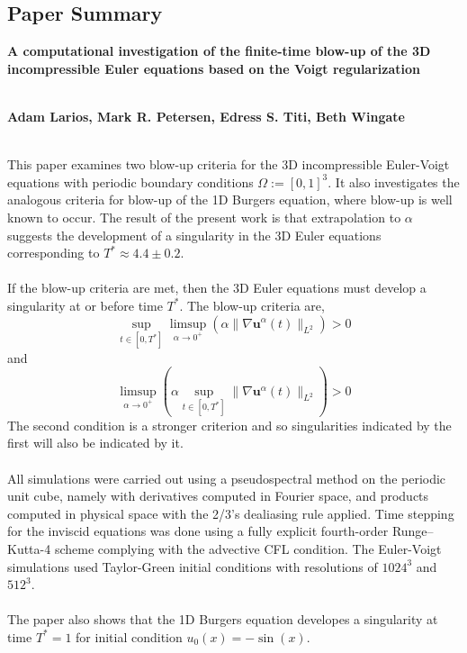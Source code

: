 \documentclass[12pt]{article}
\begin{document}
\begin{flushleft}
\pagebreak

\section{Paper Summary}
\begin{center}
\begin{large}
\textbf{A computational investigation of the finite-time blow-up of the 3D incompressible Euler equations based on the Voigt regularization}
\\~\\
\end{large}
\textbf{Adam Larios, Mark R. Petersen, Edress S. Titi, Beth Wingate}
\\~\\
\end{center}

\qquad This paper examines two blow-up criteria for the 3D incompressible Euler-Voigt equations with periodic boundary conditions $\Omega := [0,1]^3$. It also investigates the analogous criteria for blow-up of the 1D Burgers equation, where blow-up is well known to occur. The result of the present work is that extrapolation to $\alpha$ suggests the development of a singularity in the 3D Euler equations corresponding to $T^* \approx 4.4 \pm 0.2$.
\\~\\
If the blow-up criteria are met, then the 3D Euler equations must develop a singularity at or before time $T^*$. The blow-up criteria are,
$$\sup_{t\in[0,T^*]}\limsup_{\alpha\rightarrow 0^+}(\alpha\|\nabla\textbf{u}^\alpha(t)\|_{L^2}) > 0$$
and
$$\limsup_{\alpha\rightarrow 0^+} \left( \alpha \sup_{t\in [0,T^*]}\|\nabla\textbf{u}^\alpha(t)\|_{L^2} \right) > 0$$
The second condition is a stronger criterion and so singularities indicated by the first will also be indicated by it.
\\~\\
\qquad All simulations were carried out using a pseudospectral method on the periodic unit cube, namely with derivatives computed in Fourier space, and products computed in physical space with the 2/3’s dealiasing rule applied. Time stepping for the inviscid equations was done using a fully explicit fourth-order Runge–Kutta-4 scheme complying with the advective CFL condition. The Euler-Voigt simulations used Taylor-Green initial conditions with resolutions of $1024^3$ and $512^3$.
\\~\\
The paper also shows that the 1D Burgers equation developes a singularity at time $T^*=1$ for initial condition $u_0(x) = -\sin(x)$.


\end{flushleft}
\end{document}
